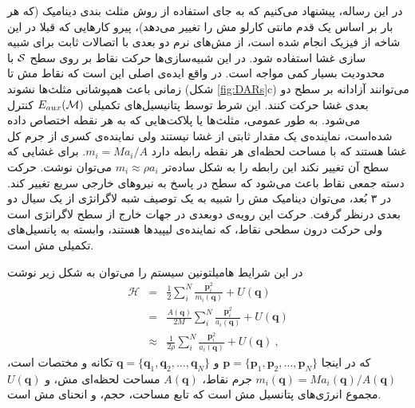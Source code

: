 در این رساله، پیشنهاد می‌کنیم که به جای استفاده از روش مثلث بندی دینامیک (که هر بار بر اساس یک قدم مانتی کارلو مش را تغییر می‌دهد)، پیرو کارهایی که قبلا در این شاخه از فیزیک انجام شده است، از مش‌های نرم دو بعدی با اتصالات ثابت برای شبیه سازی غشا استفاده شود. در این شبیه‌سازی‌ها حرکت نقاط بر روی سطح 
$\cal S$
با محدودیت بسیار کمی مواجه است. در واقع ایده‌ی اصلی این است که نقاط مش تا زمانی باعث همپوشانی مثلث‌ها نشوند (شکل
\ref{fig:DARs}c)
 می‌توانند آزادانه بر سطح دو بعدی غشا حرکت کنند. این شرط توسط پتانیسیل‌های تکمیلی
$E_{aux}({\cal M})$
کنترل می‌شود. به طور عمومی، مثلث‌ها یا پلاکت‌هایی که به هر نقطه اختصاص داده شده‌است، نماینده‌ی یک مقدار ثابتی از غشا نیستند ولی نماینده‌ی کسری از جرم کل غشا هستند که با مساحت لحظه‌ای هر نقطه رابطه دارد
 $m_i = M a_i/A$.
 برای غشایی که سطح آن تغییر نکند این رابطه را به شکل ساده‌تر
$m_i  \approx \rho a_i$
می‌توان نوشت. حرکت دسته‌ جمعی نقاط باعث می‌شود که سطح در پاسخ به نیروهای خارجی سریع تغییر کند. در ۳ بُعد، می‌توان دینامیک مش را شبیه به یک توصیف شبه لاگرانژی از یک سیال دو بعدی درنظر گرفت. حرکت این رویه‌ی دوبعدی در جهات خارج از سطح لاگرانژی است ولی حرکت درون سطحی نقاط، که نماینده‌ی لیپید‌ها هستند، وابسته به پانسیل‌های تکمیلی مش است.

در این شرایط هامیلتونین سیستم را می‌توان به شکل زیر نوشت
\begin{eqnarray}
\mathcal H&=& \frac12 \sum_i^N \frac{\bm p_i^2}{m_i(\bm q)} + U(\bm q) 
\label{eq:HamiltonianGeneral}\\
 &=& \frac {A(\bm q)}{2M}  \sum_i^N \frac{\bm p_i^2}{a_i(\bm q)} + U(\bm q) 
 \label{eq:HamiltonianGeneral with explicit areas}\\
&\approx& \frac {1}{2\rho}  \sum_i^N \frac{\bm p_i^2}{a_i(\bm q)} + U(\bm q) \ ,
\label{eq:HamiltonianVariableMass}
\end{eqnarray}
که در اینجا
$\bm p=\{\bm p_1,\bm p_2, \ldots, \bm p_N \}$
و
$\bm q=\{\bm q_1,\bm q_2, \ldots, \bm q_N \}$ 
تکانه و مختصات است،
$m_i(\bm q) = Ma_i(\bm q)/A(\bm q)$
جرم نقاط،
$A(\bm q)$
مساحت لحظه‌ای مش، و 
$U(\bm q)$
مجموع انرژی‌های پتانسیل مش است که تابع مساحت، حجم، و انحنای مش است.

